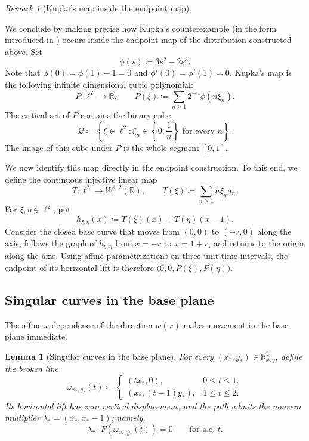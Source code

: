 \documentclass[11pt]{amsart}
\newtheorem{lemma}[theorem]{Lemma}
\numberwithin{equation}{section}
\theoremstyle{remark}
\newtheorem{remark}[theorem]{Remark}
\newcommand{\R}{\mathbb R}
\begin{document}
\begin{remark}[Kupka's map inside the endpoint map]
\label{sec:kupka-map}

We conclude by making precise how Kupka's counterexample (in the form introduced in \cite{yomdincomte}) occurs inside
the endpoint map of the distribution constructed above.  Set
\begin{equation}
 \phi(s)\coloneq3s^2-2s^3.
\end{equation}
Note that $\phi(0)=\phi(1)-1=0$ and $\phi'(0)=\phi'(1)=0$. Kupka's map  is the following infinite dimensional cubic polynomial:
\begin{equation}
 P:\ell^2\longrightarrow\R,
 \qquad
 P(\xi)\coloneq\sum_{n\geq1}2^{-n}\phi(n\xi_n).
\end{equation}
The critical set of $P$ contains the binary cube
\begin{equation}
 \mathcal Q\coloneq
 \left\{\xi\in\ell^2:\xi_n\in\left\{0,\frac1n\right\}
 \text{ for every }n\right\}.
\end{equation}
The image of this cube under $P$ is the whole segment $[0,1]$.

We now identify this map directly in the endpoint construction. To this end, we define the  continuous injective linear map
\begin{equation}
 T:\ell^2\longrightarrow W^{1,2}(\R),
 \qquad
 T(\xi)\coloneq\sum_{n\geq1}n\xi_na_n.\end{equation}
For
$\xi,\eta\in\ell^2$, put
\begin{equation}
 h_{\xi,\eta}(x)\coloneq T(\xi)(x)+T(\eta)(x-1).
\end{equation}
Consider the closed base curve that moves from $(0,0)$ to $(-r,0)$ along
the axis, follows the graph of $h_{\xi,\eta}$ from $x=-r$ to $x=1+r$,
and returns to the origin along the axis.  Using affine parametrizations
on three unit time intervals, the endpoint of its horizontal lift is therefore $ 
 \bigl(0,0,P(\xi),P(\eta)\bigr).$
\end{remark}
\subsection{Singular curves in the base plane}

The affine $x$-dependence of the direction $w(x)$ makes movement in
the base plane immediate.

\begin{lemma}[Singular curves in  the base plane]\label{lem:base-access}
For every $(x_*,y_*)\in\R_{x,y}^2$, define the broken line
\begin{equation}\label{eq:base-path}
 \omega_{x_*,y_*}(t)\coloneq
 \begin{cases}
  (tx_*,0),&0\leq t\leq1,\\
  (x_*,(t-1)y_*),&1\leq t\leq2.
 \end{cases}
\end{equation}
Its horizontal lift has zero vertical displacement, and the path admits
the nonzero multiplier $\lambda_*=(x_*,x_*-1)$; namely,
\begin{equation}
 \lambda_*\cdot F(\omega_{x_*,y_*}(t))=0
 \qquad\text{for a.e. }t.
\end{equation}
\end{lemma}
\end{document}
